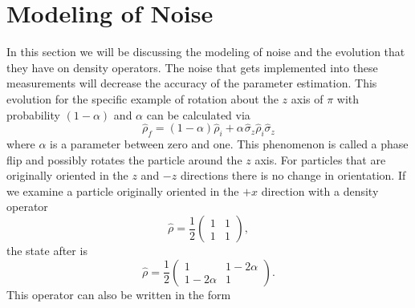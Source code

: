 \documentclass[twocolumn]{article}
\begin{document}
\section*{Modeling of Noise}
In this section we will be discussing the modeling of noise and the evolution that they have on density operators. The noise that gets implemented into these measurements will decrease the accuracy of the parameter estimation. This evolution for the specific example of rotation about the $z$ axis of $\pi$ with probability $(1-\alpha)$ and $\alpha$ can be calculated via
\begin{equation} \label{Eq: EDOAZ}
\hat{\rho}_f=(1-\alpha)\hat{\rho}_i+\alpha\hspace{1pt}\hat{\sigma}_z\hat{\rho}_i\hat{\sigma}_z
\end{equation}
where $\alpha$ is a parameter between zero and one. This phenomenon is called a phase flip and possibly rotates the particle around the $z$ axis. For particles that are originally oriented in the $z$ and $-z$ directions there is no change in orientation. If we examine a particle originally oriented in the $+x$ direction with a density operator 
\begin{equation} \label{Eq: MONDO+X}
\hat{\rho}=\frac{1}{2}
\begin{pmatrix}
1 & 1 \\
1 & 1
\end{pmatrix},
\end{equation}
the state after is
\begin{equation} \label{Eq: MONEDO+X}
\hat{\rho}=\frac{1}{2}
\begin{pmatrix}
1 & 1-2\alpha \\
1-2\alpha & 1
\end{pmatrix}.
\end{equation}
This operator can also be written in the form
\end{document}
